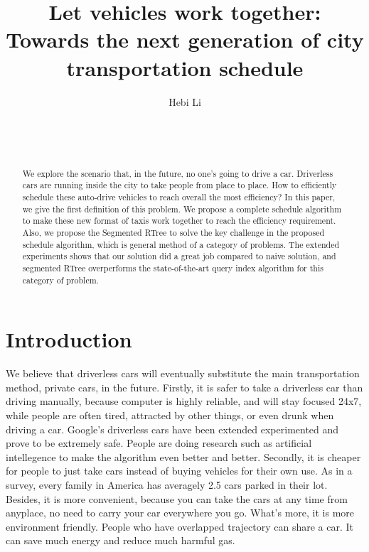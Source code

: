 \documentclass{vldb}
\begin{document}
\title{Let vehicles work together:
Towards the next generation of city transportation schedule}

\author{
\alignauthor
Hebi Li\\
       \\
       \\
       \\
}

\maketitle

\begin{abstract}
We explore the scenario that, in the future, no one's going to drive a car.
Driverless cars are running inside the city to take people from place to place.
How to efficiently schedule these auto-drive vehicles to reach overall the most efficiency?
In this paper, we give the first definition of this problem.
We propose a complete schedule algorithm to make these new format of taxis work together to reach the efficiency requirement.
Also, we propose the Segmented RTree to solve the key challenge in the proposed schedule algorithm,
which is general method of a category of problems.
The extended experiments shows that our solution did a great job compared to naive solution,
and segmented RTree overperforms the state-of-the-art query index algorithm for this category of problem.
\end{abstract}




\section{Introduction}

We believe that driverless cars will eventually substitute the main transportation method,
private cars, in the future. Firstly, it is safer to take a driverless car than driving manually,
because computer is highly reliable, and will stay focused 24x7,
while people are often tired, attracted by other things, or even drunk when driving a car.
Google’s driverless cars have been extended experimented and prove to be extremely safe.
People are doing research such as artificial intellegence to make the algorithm even better and better.
Secondly, it is cheaper for people to just take cars instead of buying vehicles for their own use.
As in a survey, every family in America has averagely 2.5 cars parked in their lot.
Besides, it is more convenient, because you can take the cars at any time from anyplace,
no need to carry your car everywhere you go. What’s more, it is more environment friendly.
People who have overlapped trajectory can share a car.
It can save much energy and reduce much harmful gas.
\end{document}
